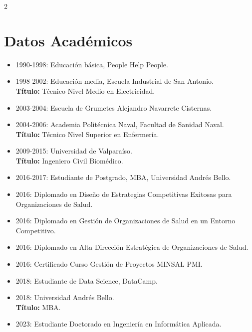 \documentclass[lighthipster]{simplehipstercv}
\begin{document}
\begin{paracol}{2}
\section*{Datos Académicos}
\begin{itemize}
    \item 1990-1998: Educación básica, People Help People.
    \item 1998-2002: Educación media, Escuela Industrial de San Antonio. \\
    \textbf{Título:} Técnico Nivel Medio en Electricidad.
    \item 2003-2004: Escuela de Grumetes Alejandro Navarrete Cisternas.
    \item 2004-2006: Academia Politécnica Naval, Facultad de Sanidad Naval. \\
    \textbf{Título:} Técnico Nivel Superior en Enfermería.
    \item 2009-2015: Universidad de Valparaíso. \\
    \textbf{Título:} Ingeniero Civil Biomédico.
    \item 2016-2017: Estudiante de Postgrado, MBA, Universidad Andrés Bello.
    \item 2016: Diplomado en Diseño de Estrategias Competitivas Exitosas para Organizaciones de Salud.
    \item 2016: Diplomado en Gestión de Organizaciones de Salud en un Entorno Competitivo.
    \item 2016: Diplomado en Alta Dirección Estratégica de Organizaciones de Salud.
    \item 2016: Certificado Curso Gestión de Proyectos MINSAL PMI.
    \item 2018: Estudiante de Data Science, DataCamp.
    \item 2018: Universidad Andrés Bello. \\
    \textbf{Título:} MBA.
    \item 2023: Estudiante Doctorado en Ingeniería en Informática Aplicada.
\end{itemize}

\vspace{.5em}



\end{paracol}
\end{document}
